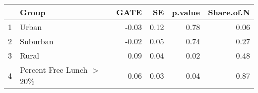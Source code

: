\begin{tabular}{rlrrrr}
  \hline
 & Group & GATE & SE & p.value & Share.of.N \\ 
  \hline
1 & Urban & -0.03 & 0.12 & 0.78 & 0.06 \\ 
  2 & Suburban & -0.02 & 0.05 & 0.74 & 0.27 \\ 
  3 & Rural & 0.09 & 0.04 & 0.02 & 0.48 \\ 
  4 & Percent Free Lunch $>$ 20\% & 0.06 & 0.03 & 0.04 & 0.87 \\ 
   \hline
\end{tabular}

